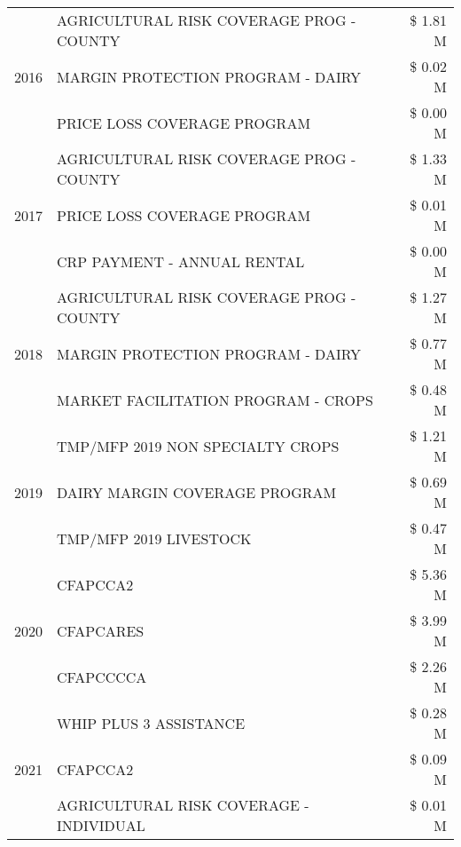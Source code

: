 \begin{tabular}{llr}
\cline{1-3}
\multirow[t]{3}{*}{2016} & AGRICULTURAL RISK COVERAGE PROG - COUNTY & \$ 1.81 M \\
 & MARGIN PROTECTION PROGRAM - DAIRY & \$ 0.02 M \\
 & PRICE LOSS COVERAGE PROGRAM & \$ 0.00 M \\
\cline{1-3}
\multirow[t]{3}{*}{2017} & AGRICULTURAL RISK COVERAGE PROG - COUNTY & \$ 1.33 M \\
 & PRICE LOSS COVERAGE PROGRAM & \$ 0.01 M \\
 & CRP PAYMENT - ANNUAL RENTAL & \$ 0.00 M \\
\cline{1-3}
\multirow[t]{3}{*}{2018} & AGRICULTURAL RISK COVERAGE PROG - COUNTY & \$ 1.27 M \\
 & MARGIN PROTECTION PROGRAM - DAIRY & \$ 0.77 M \\
 & MARKET FACILITATION PROGRAM - CROPS & \$ 0.48 M \\
\cline{1-3}
\multirow[t]{3}{*}{2019} & TMP/MFP 2019 NON SPECIALTY CROPS & \$ 1.21 M \\
 & DAIRY MARGIN COVERAGE PROGRAM & \$ 0.69 M \\
 & TMP/MFP 2019 LIVESTOCK & \$ 0.47 M \\
\cline{1-3}
\multirow[t]{3}{*}{2020} & CFAPCCA2 & \$ 5.36 M \\
 & CFAPCARES & \$ 3.99 M \\
 & CFAPCCCCA & \$ 2.26 M \\
\cline{1-3}
\multirow[t]{3}{*}{2021} & WHIP PLUS 3 ASSISTANCE & \$ 0.28 M \\
 & CFAPCCA2 & \$ 0.09 M \\
 & AGRICULTURAL RISK COVERAGE - INDIVIDUAL & \$ 0.01 M \\
\cline{1-3}
\bottomrule
\end{tabular}
